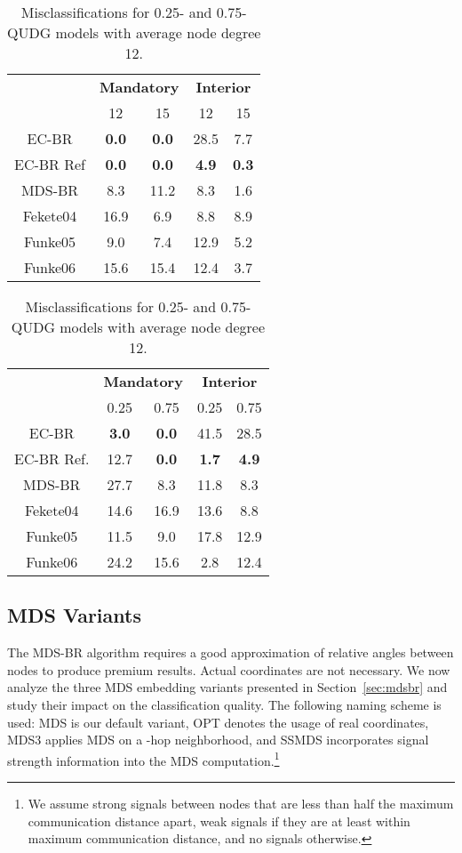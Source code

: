 \documentclass{llncs}
\begin{document}
\begin{table}[t]
\begin{minipage}[t]{0.48\columnwidth}
\setlength\tabcolsep{5pt}
\centering
\caption{Misclassifications for the 0.75-QUDG model and different average node degrees.}\label{tab::qudg1}
\begin{tabular}{c||cc||cc}
& \multicolumn{2}{c||}{\bfseries Mandatory}& \multicolumn{2}{c}{\bfseries Interior} \\
& 12 & 15 & 12 & 15 \\
\hline
EC-BR & \bfseries 0.0 & \bfseries 0.0 & 28.5 & 7.7  \\
EC-BR Ref & \bfseries 0.0 & \bfseries 0.0 & \bfseries 4.9 & \bfseries 0.3  \\
MDS-BR & 8.3 & 11.2 & 8.3 & 1.6  \\
\hline
Fekete04 & 16.9 & 6.9 & 8.8 & 8.9  \\
Funke05 & 9.0 & 7.4 & 12.9 & 5.2  \\
Funke06 & 15.6 & 15.4 & 12.4 & 3.7
\end{tabular}
\end{minipage}
\hfill
\begin{minipage}[t]{0.48\columnwidth}
\setlength\tabcolsep{5pt}
\centering
\caption{Misclassifications for 0.25- and 0.75-QUDG models with average node degree 12.}\label{tab::qudg2}
\begin{tabular}{c||cc||cc}
& \multicolumn{2}{c||}{\bfseries Mandatory}& \multicolumn{2}{c}{\bfseries Interior} \\
& 0.25 & 0.75 & 0.25 & 0.75 \\
\hline
EC-BR & \bfseries 3.0 & \bfseries 0.0 & 41.5 & 28.5  \\
EC-BR Ref. & 12.7 & \bfseries 0.0 & \bfseries 1.7 & \bfseries 4.9  \\
MDS-BR & 27.7 & 8.3 & 11.8 & 8.3  \\
\hline
Fekete04 & 14.6 & 16.9 & 13.6 & 8.8  \\
Funke05 & 11.5 & 9.0 & 17.8 & 12.9  \\
Funke06 & 24.2 & 15.6 & 2.8 & 12.4
\end{tabular}
\end{minipage}
\end{table}


\subsection{MDS Variants}\label{ssec:variants}
The MDS-BR algorithm requires a good approximation of relative angles between nodes to produce premium results.
Actual coordinates are not necessary.
We now analyze the three MDS embedding variants presented in Section~\ref{sec:mdsbr} and study their impact on the classification quality.
The following naming scheme is used: MDS is our default variant, OPT denotes the usage of real coordinates, MDS3 applies MDS on a -hop neighborhood, and SSMDS incorporates signal strength information into the MDS computation.\footnote{We assume strong signals between nodes that are less than half the maximum communication distance apart, weak signals if they are at least within maximum communication distance, and no signals otherwise.}
\end{document}
